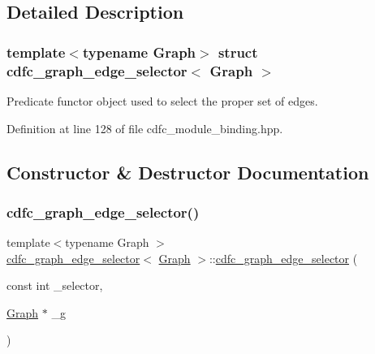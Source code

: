 \subsection{Detailed Description}
\subsubsection*{template$<$typename Graph$>$\newline
struct cdfc\+\_\+graph\+\_\+edge\+\_\+selector$<$ Graph $>$}

Predicate functor object used to select the proper set of edges. 

Definition at line 128 of file cdfc\+\_\+module\+\_\+binding.\+hpp.



\subsection{Constructor \& Destructor Documentation}
\mbox{\label{structcdfc__graph__edge__selector_ad8bf285670465492140703ab95431789}} 
\subsubsection{\texorpdfstring{cdfc\+\_\+graph\+\_\+edge\+\_\+selector()}{cdfc\_graph\_edge\_selector()}\hspace{0.1cm}{\footnotesize\ttfamily [1/2]}}
{\footnotesize\ttfamily template$<$typename Graph $>$ \\
\hyperlink{structcdfc__graph__edge__selector}{cdfc\+\_\+graph\+\_\+edge\+\_\+selector}$<$ \hyperlink{structGraph}{Graph} $>$\+::\hyperlink{structcdfc__graph__edge__selector}{cdfc\+\_\+graph\+\_\+edge\+\_\+selector} (\begin{DoxyParamCaption}\item[{const int}]{\+\_\+selector,  }\item[{\hyperlink{structGraph}{Graph} $\ast$}]{\+\_\+g }\end{DoxyParamCaption})\hspace{0.3cm}{\ttfamily [inline]}}



